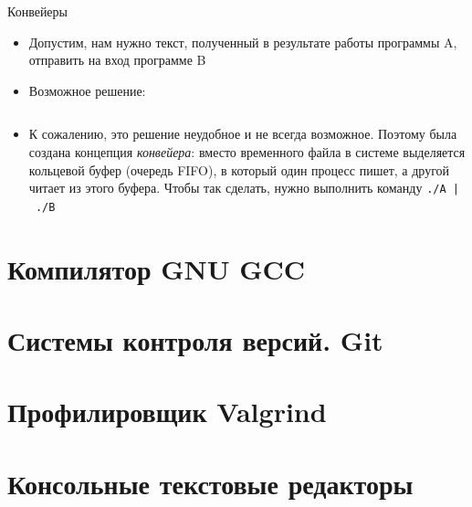 \documentclass{beamer}
\begin{document}
\begin{frame}{Конвейеры}
	\begin{itemize}
		\item{Допустим, нам нужно текст, полученный в результате работы программы A, отправить на вход программе B}\pause
		\item{Возможное решение:}
	\end{itemize}
	\vspace*{-\baselineskip}
	\inputminted[linenos,bgcolor=listing]{bash}{files/01/nopipe.sh}\pause
	\vspace*{-\baselineskip}
	\begin{itemize}
		\item{К сожалению, это решение неудобное и не всегда возможное. Поэтому была создана концепция \emph{конвейера}: вместо временного файла в системе выделяется кольцевой буфер (очередь FIFO), в который один процесс пишет, а другой читает из этого буфера. Чтобы так сделать, нужно выполнить команду \texttt{./A~|~./B}}
	\end{itemize}
\end{frame}

\section{Компилятор GNU GCC}
\begin{frame}
\end{frame}

\section{Системы контроля версий. Git}
\begin{frame}
\end{frame}

\section{Профилировщик Valgrind}
\begin{frame}
\end{frame}

\section{Консольные текстовые редакторы}
\begin{frame}
\end{frame}
\end{document}
